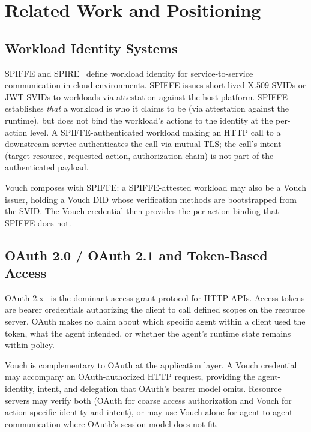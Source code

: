 \documentclass[11pt,a4paper]{article}
\begin{document}
\section{Related Work and Positioning}
\label{sec:related}

\subsection{Workload Identity Systems}

SPIFFE and SPIRE~\cite{strong2018spiffe} define workload identity for service-to-service communication in cloud environments. SPIFFE issues short-lived X.509 SVIDs or JWT-SVIDs to workloads via attestation against the host platform. SPIFFE establishes \emph{that} a workload is who it claims to be (via attestation against the runtime), but does not bind the workload's actions to the identity at the per-action level. A SPIFFE-authenticated workload making an HTTP call to a downstream service authenticates the call via mutual TLS; the call's intent (target resource, requested action, authorization chain) is not part of the authenticated payload.

Vouch composes with SPIFFE: a SPIFFE-attested workload may also be a Vouch issuer, holding a Vouch DID whose verification methods are bootstrapped from the SVID. The Vouch credential then provides the per-action binding that SPIFFE does not.

\subsection{OAuth 2.0 / OAuth 2.1 and Token-Based Access}

OAuth 2.x~\cite{rfc6749,rfc9700} is the dominant access-grant protocol for HTTP APIs. Access tokens are bearer credentials authorizing the client to call defined scopes on the resource server. OAuth makes no claim about which specific agent within a client used the token, what the agent intended, or whether the agent's runtime state remains within policy.

Vouch is complementary to OAuth at the application layer. A Vouch credential may accompany an OAuth-authorized HTTP request, providing the agent-identity, intent, and delegation that OAuth's bearer model omits. Resource servers may verify both (OAuth for coarse access authorization and Vouch for action-specific identity and intent), or may use Vouch alone for agent-to-agent communication where OAuth's session model does not fit.
\end{document}
